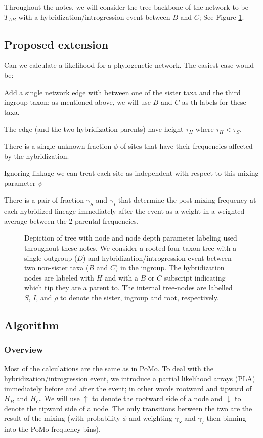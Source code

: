 \documentclass{article}
\begin{document}
Throughout the notes, we will consider the tree-backbone of the network to be $T_{AB}$ with a hybridization/introgression event between $B$ and $C$; See Figure \ref{fig:tree}.

\subsection{Proposed extension}
Can we calculate a likelihood for a phylogenetic network. 
The easiest case would be:
\begin{compactitem}
    \item Add a single network edge with between one of the sister taxa and the third ingroup taxon; as mentioned above, we will use $B$ and $C$ as th labels for these taxa.
    \item The edge (and the two hybridization parents) have height $\tau_H$ where $\tau_H < \tau_S$.
    \item There is a single unknown fraction $\phi$ of sites that have their frequencies affected by the hybridization.
    \item Ignoring linkage we can treat each site as independent with respect to this mixing parameter $\psi$
    \item There is a pair of fraction $\gamma_S$ and $\gamma_I$ that determine the post mixing frequency at each hybridized lineage immediately after the event as a weight in a weighted average between the 2 parental frequencies.
\end{compactitem}

\begin{figure}[htp]
\centering

\caption{Depiction of tree with node and node depth parameter labeling used throughout these notes. We consider a rooted four-taxon tree with a single outgroup ($D$) and hybridization/introgression event between two non-sister taxa ($B$ and $C$) in the ingroup. The hybridization nodes are labeled with $H$ and with a $B$ or $C$ subscript indicating which tip they are a parent to. The internal tree-nodes are labelled $S$, $I$, and $\rho$ to denote the sister, ingroup and root, respectively.}
\label{fig:tree}
\end{figure}

\subsection{Algorithm}
\subsubsection{Overview}
Most of the calculations are the same as in PoMo.
To deal with the hybridization/introgression event, we introduce a partial likelihood arrays (PLA) immediately before and after the event; in other words rootward and tipward of $H_B$ and $H_C$.
We will use $\uparrow$ to denote the rootward side of a node and $\downarrow$ to denote the tipward side of a node.
The only transitions between the two are the result of the mixing (with probability $\phi$ and weighting $\gamma_S$ and $\gamma_I$ then binning into the PoMo frequency bins).
\end{document}

